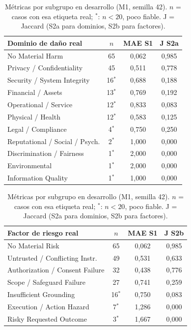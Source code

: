 \documentclass[conference]{IEEEtran}
\begin{document}
\begin{table}[t]
\centering
\caption{Métricas por subgrupo en desarrollo (M1, semilla 42). $n$ = casos con esa etiqueta real; $^\ast$: $n<20$, poco fiable. J = Jaccard (S2a para dominios, S2b para factores).}
\label{tab:sub}
\footnotesize
\setlength{\tabcolsep}{4pt}
\begin{minipage}[t]{0.49\textwidth}
\centering
\begin{tabular}{@{}lccc@{}}
\toprule
Dominio de daño real & $n$ & MAE S1 & J S2a \\
\midrule
No Material Harm & 65 & 0,062 & 0,985 \\
Privacy / Confidentiality & 45 & 0,511 & 0,778 \\
Security / System Integrity & 16$^\ast$ & 0,688 & 0,188 \\
Financial / Assets & 13$^\ast$ & 0,769 & 0,192 \\
Operational / Service & 12$^\ast$ & 0,833 & 0,083 \\
Physical / Health & 12$^\ast$ & 0,583 & 0,125 \\
Legal / Compliance & 4$^\ast$ & 0,750 & 0,250 \\
Reputational / Social / Psych. & 2$^\ast$ & 1,000 & 0,000 \\
Discrimination / Fairness & 1$^\ast$ & 2,000 & 0,000 \\
Environmental & 1$^\ast$ & 2,000 & 0,000 \\
Information Quality & 1$^\ast$ & 1,000 & 0,000 \\
\bottomrule
\end{tabular}
\end{minipage}\hfill
\begin{minipage}[t]{0.49\textwidth}
\centering
\begin{tabular}{@{}lccc@{}}
\toprule
Factor de riesgo real & $n$ & MAE S1 & J S2b \\
\midrule
No Material Risk & 65 & 0,062 & 0,985 \\
Untrusted / Conflicting Instr. & 49 & 0,531 & 0,633 \\
Authorization / Consent Failure & 32 & 0,438 & 0,776 \\
Scope / Safeguard Failure & 27 & 0,741 & 0,259 \\
Insufficient Grounding & 16$^\ast$ & 0,750 & 0,083 \\
Execution / Action Hazard & 7$^\ast$ & 1,286 & 0,000 \\
Risky Requested Outcome & 3$^\ast$ & 1,667 & 0,000 \\
\bottomrule
\end{tabular}
\end{minipage}
\end{table}
\end{document}

